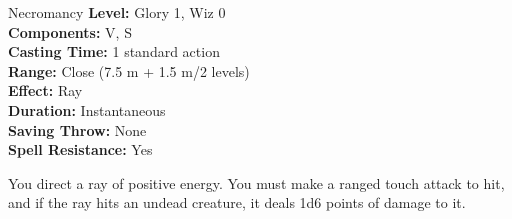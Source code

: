 {Necromancy}
{
	\textbf{Level:}
	Glory 1, Wiz 0\\
	\textbf{Components:}
	V, S\\
	\textbf{Casting Time:}
	1 standard action\\
	\textbf{Range:}
	Close (7.5 m + 1.5 m/2 levels)\\
	\textbf{Effect:}
	Ray\\
	\textbf{Duration:}
	Instantaneous\\
	\textbf{Saving Throw:}
	None\\
	\textbf{Spell Resistance:}
	Yes\\
}
{
	You direct a ray of positive energy. You must make a ranged touch attack to hit, and if the ray hits an undead creature, it deals 1d6 points of damage to it.

}
